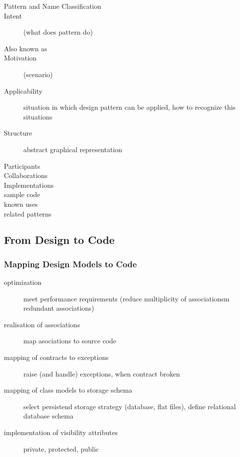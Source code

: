 \documentclass[a4paper, 10pt]{article}
\begin{document}
\begin{description}
	\item[Pattern and Name Classification]
	\item[Intent] (what does pattern do)
	\item[Also known as]
	\item[Motivation] (scenario)
	\item[Applicability] situation in which design pattern can be applied, how to recognize this situations
	\item[Structure] abstract graphical representation
	\item[Participants]
	\item[Collaborations]
	\item[Implementations]
	\item[sample code]
	\item[known uses]
	\item[related patterns]
\end{description}

\subsection{From Design to Code}
\subsubsection{Mapping Design Models to Code}
\begin{description}
	\item[optimization] meet performance requirements (reduce multiplicity of associationsm redundant associations)
	\item[realisation of associations] map asociations to source code
	\item[mapping of contracts to exceptions] raise (and handle) exceptions, when contract broken
	\item[mapping of class models to storage schema] select persistend storage strategy (database, flat files), define relational database schema
	\item[implementation of visibility attributes] private, protected, public
\end{description}
\end{document}

